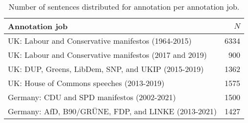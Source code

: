 \begin{table}[!t]

\caption{\label{tab:n_samples_per_job}Number of sentences distributed for annotation per annotation job.}
\centering
\fontsize{10}{12}\selectfont
\begin{tabular}[t]{lr}
\toprule
Annotation job & $N$\\
\midrule
UK: Labour and Conservative manifestos (1964-2015) & 6334\\
UK: Labour and Conservative manifestos (2017 and 2019) & 900\\
UK: DUP, Greens, LibDem, SNP, and UKIP (2015-2019) & 1362\\
UK: House of Commons speeches (2013-2019) & 1575\\
Germany: CDU and SPD manifestos (2002-2021) & 1500\\
Germany: AfD, B90/GRÜNE, FDP, and LINKE (2013-2021) & 1427\\
\bottomrule
\end{tabular}
\end{table}
